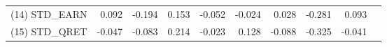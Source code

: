 \documentclass{beamer}
\begin{document}
\begin{frame}[noframenumbering]
\begin{table}[H]
\begin{tabular}{lrrrrrrrrr}
			(14) STD\_EARN & 0.092 & -0.194 & 0.153 & -0.052 & -0.024 & 0.028 & -0.281 & 0.093 &  \\
			(15) STD\_QRET & -0.047 & -0.083 & 0.214 & -0.023 & 0.128 & -0.088 & -0.325 & -0.041 & \\
			\bottomrule
			\bottomrule
		\end{tabular}%
	\end{table}%
	
\end{frame}



\end{document}
